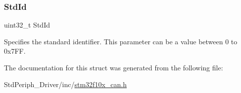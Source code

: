 \subsubsection{\texorpdfstring{StdId}{StdId}}
{\footnotesize\ttfamily uint32\+\_\+t Std\+Id}

Specifies the standard identifier. This parameter can be a value between 0 to 0x7\+FF. 

The documentation for this struct was generated from the following file\+:\begin{DoxyCompactItemize}
\item 
Std\+Periph\+\_\+\+Driver/inc/\mbox{\hyperlink{stm32f10x__can_8h}{stm32f10x\+\_\+can.\+h}}\end{DoxyCompactItemize}
